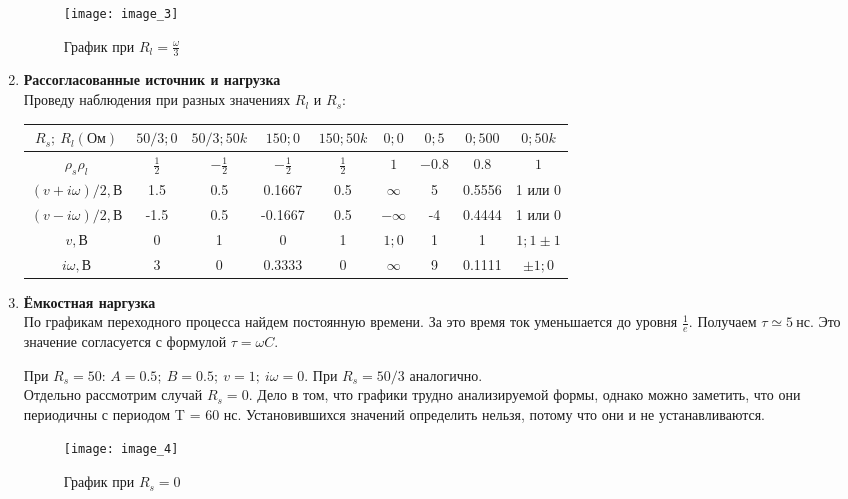 \begin{enumerate}
\begin{figure}[!h]
	\centering\texttt{[image: image\_3]}
	\caption{График при $R_l = \frac{\omega}{3}$}
	\label{fig:image_3}
\end{figure}

\newpage
\item\textbf{Рассогласованные источник и нагрузка}\\
Проведу наблюдения при разных значениях $R_l$ и $R_s$:
	\begin{table}[h!]
	\centering
	\begin{tabular}{|c|c|c|c|c|c|c|c|c|} \hline
		$R_s;\ R_l (Ом)$ & $50/3; 0$ & $50/3; 50k$ & $150; 0$ & $150; 50k$ & $0; 0$ & $0; 5$ & $0; 500$ & $0; 50k$ \\ \hline 
		$\rho_s\rho_l$ & $\frac{1}{2}$ & $-\frac{1}{2}$ & $-\frac{1}{2}$ & $\frac{1}{2}$ & $1$ & $-0.8$ & $0.8$ & $1$  \\ \hline
		$(v + i\omega)/2, В$ & 1.5 & 0.5 & 0.1667 & 0.5 & $\infty$ & 5 & 0.5556 & 1 или 0 \\ \hline
		$(v - i\omega)/2, В$ & -1.5 & 0.5 & -0.1667 & 0.5 & $-\infty$ & -4 & 0.4444 & 1 или 0\\ \hline
		$v, В$ & 0 & 1 & 0 & 1 & $1; 0$ & 1 & 1 & $1; 1 \pm 1$ \\ \hline
		$i\omega, В$ & 3 & 0 & 0.3333 & 0 & $\infty$ & 9 & 0.1111 & $\pm 1; 0$ \\ \hline
	\end{tabular}
\end{table}


\item\textbf{Ёмкостная наргузка}\\
По графикам переходного процесса найдем постоянную времени. За это время ток уменьшается до уровня $\frac{1}{e}$. Получаем $\tau \simeq 5\ нс$. Это значение согласуется с формулой $\tau = \omega C$.

При $R_s = 50$: $A = 0.5;\ B = 0.5;\ v = 1;\ i\omega = 0$. При $R_s = 50/3$ аналогично. \\

Отдельно рассмотрим случай $R_s = 0$. Дело в том, что графики трудно анализируемой формы, однако можно заметить, что они периодичны с периодом T = 60 нс. Установившихся значений определить нельзя, потому что они и не устанавливаются.

\begin{figure}[!h]
	\centering\texttt{[image: image\_4]}
	\caption{График при $R_s = 0$}
	\label{fig:image_4}
\end{figure}

\end{enumerate}
